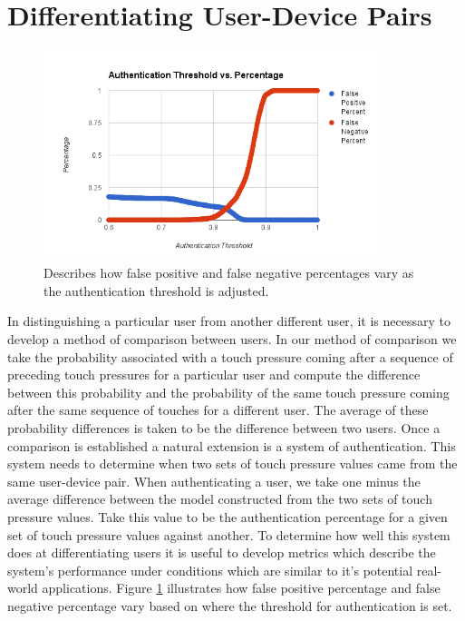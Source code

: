\documentclass{acm_proc_article-sp}
\begin{document}
\section{Differentiating User-Device Pairs}
\label{sec:differentiation}


\begin{figure}
\centering
\includegraphics[width=3.9in]{threshold_vs_percentages.png}
\caption{Describes how false positive and false negative percentages vary as the authentication threshold is adjusted.}
\label{fig:threshold_vs_percentages}
\end{figure}

In distinguishing a particular user from another different user, it is necessary to develop a method of comparison between users. In our method of comparison we take the probability associated with a touch pressure coming after a sequence of preceding touch pressures for a particular user and compute the difference between this probability and the probability of the same touch pressure coming after the same sequence of touches for a different user. The average of these probability differences is taken to be the difference between two users.
%
Once a comparison is established a natural extension is a system of authentication. This system needs to determine when two sets of touch pressure values came from the same user-device pair. When authenticating a user, we take one minus the average difference between the model constructed from the two sets of touch pressure values. Take this value to be the authentication percentage for a given set of touch pressure values against another.
%
To determine how well this system does at differentiating users it is useful to develop metrics which describe the system's performance under conditions which are similar to it's potential real-world applications. Figure \ref{fig:threshold_vs_percentages} illustrates how false positive percentage and false negative percentage vary based on where the threshold for authentication is set. 
\end{document}
